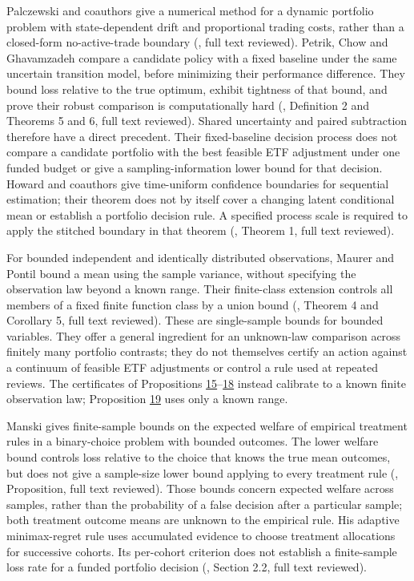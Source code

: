 \documentclass[11pt]{article}
\begin{document}
Palczewski and coauthors give a numerical method for a dynamic portfolio problem with
state-dependent drift and proportional trading costs, rather than a closed-form
no-active-trade boundary (\cite{palczewski2013dynamic}, full text reviewed). Petrik, Chow and
Ghavamzadeh compare a candidate policy with a fixed baseline under the same
uncertain transition model, before minimizing their performance difference.
They bound loss relative to the true optimum, exhibit tightness of that bound,
and prove their robust comparison is computationally hard
(\cite{petrik2016safe}, Definition 2 and Theorems 5 and 6, full text reviewed).
Shared uncertainty and paired subtraction therefore have a direct precedent.
Their fixed-baseline decision process does not compare a candidate portfolio
with the best feasible ETF adjustment under one funded budget or give a
sampling-information lower bound for that decision. Howard and coauthors
give time-uniform confidence boundaries for sequential estimation; their theorem does
not by itself cover a changing latent conditional mean or establish a portfolio
decision rule. A specified process scale is required to apply the
stitched boundary in that theorem (\cite{howard2021time}, Theorem 1,
full text reviewed).

For bounded independent and identically distributed observations,
Maurer and Pontil bound a
mean using the sample variance, without specifying the observation
law beyond a known range. Their finite-class extension controls
all members of a fixed finite function class by a union bound
(\cite{maurer2009empirical}, Theorem 4 and Corollary 5, full text reviewed).
These are single-sample bounds for bounded variables. They offer a
general ingredient for an unknown-law comparison across finitely
many portfolio contrasts; they do not themselves certify an action
against a continuum of feasible ETF adjustments or control a rule
used at repeated reviews. The certificates of Propositions \hyperref[res:Proposition-15]{15}--\hyperref[res:Proposition-18]{18}
instead calibrate to a known finite observation law; Proposition \hyperref[res:Proposition-19]{19}
uses only a known range.

Manski gives finite-sample bounds on the expected welfare of empirical treatment
rules in a binary-choice problem with bounded outcomes. The lower welfare bound
controls loss relative to the choice that knows the true mean outcomes,
but does not give a sample-size lower bound applying to every treatment rule
(\cite{manski1999statistical}, Proposition, full text reviewed). Those bounds
concern expected welfare across samples, rather than the probability of a
false decision after a particular sample; both treatment outcome means are
unknown to the empirical rule. His adaptive minimax-regret rule uses
accumulated evidence to choose treatment allocations for successive
cohorts. Its per-cohort criterion does not establish a
finite-sample loss rate for a funded portfolio decision
(\cite{manski2007adaptive}, Section 2.2, full text reviewed).
\end{document}
